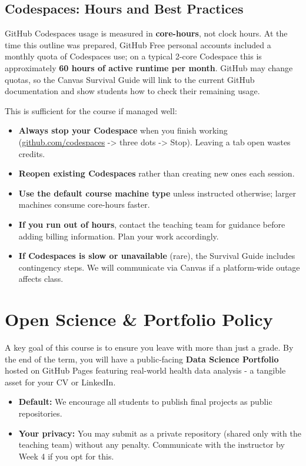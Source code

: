 \documentclass[
  letterpaper,
  DIV=11,
  numbers=noendperiod,
  oneside]{scrreprt}
\providecommand{\tightlist}{%
  \setlength{\itemsep}{0pt}\setlength{\parskip}{0pt}}
\begin{document}
\subsection{Codespaces: Hours and Best
Practices}\label{codespaces-hours-and-best-practices}

GitHub Codespaces usage is measured in \textbf{core-hours}, not clock
hours. At the time this outline was prepared, GitHub Free personal
accounts included a monthly quota of Codespaces use; on a typical 2-core
Codespace this is approximately \textbf{60 hours of active runtime per
month}. GitHub may change quotas, so the Canvas Survival Guide will link
to the current GitHub documentation and show students how to check their
remaining usage.

This is sufficient for the course if managed well:

\begin{itemize}
\tightlist
\item
  \textbf{Always stop your Codespace} when you finish working
  (\href{https://github.com/codespaces}{github.com/codespaces}
  -\textgreater{} three dots -\textgreater{} Stop). Leaving a tab open
  wastes credits.
\item
  \textbf{Reopen existing Codespaces} rather than creating new ones each
  session.
\item
  \textbf{Use the default course machine type} unless instructed
  otherwise; larger machines consume core-hours faster.
\item
  \textbf{If you run out of hours}, contact the teaching team for
  guidance before adding billing information. Plan your work
  accordingly.
\item
  \textbf{If Codespaces is slow or unavailable} (rare), the Survival
  Guide includes contingency steps. We will communicate via Canvas if a
  platform-wide outage affects class.
\end{itemize}

\section{Open Science \& Portfolio
Policy}\label{open-science-portfolio-policy}

A key goal of this course is to ensure you leave with more than just a
grade. By the end of the term, you will have a public-facing
\textbf{Data Science Portfolio} hosted on GitHub Pages featuring
real-world health data analysis - a tangible asset for your CV or
LinkedIn.

\begin{itemize}
\tightlist
\item
  \textbf{Default:} We encourage all students to publish final projects
  as public repositories.
\item
  \textbf{Your privacy:} You may submit as a private repository (shared
  only with the teaching team) without any penalty. Communicate with the
  instructor by Week 4 if you opt for this.
\end{itemize}
\end{document}

